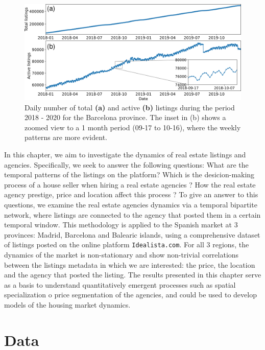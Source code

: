 \begin{figure}
    \vspace{0.2 cm}
    \centering
    \includegraphics[width =\textwidth]{Figs/Idealista_dynamics/adds_evo.pdf}
	\caption[Active listings evolution.]{\label{fig:active_adds} Daily number of total \textbf{(a)} and active \textbf{(b)} listings during the period 2018 - 2020 for the Barcelona province. The inset in (b) shows a zoomed view to a 1 month period (09-17 to 10-16), where the weekly patterns are more evident.}
\end{figure}

In this chapter, we aim to investigate the dynamics of real estate listings and agencies. Specifically, we seek to answer the following questions: What are the temporal patterns of the listings on the platform? Which is the desicion-making process of a house seller when hiring a real estate agencies ? How the real estate agency prestige, price and location affect this process ? To give an answer to this questions, we examine the real estate agencies dynamics via a temporal bipartite network, where listings are connected to the agency that posted them in a certain temporal window. This methodology is applied to the Spanish market at 3 provinces: Madrid, Barcelona and Balearic islands, using a comprehensive dataset of listings posted on the online platform \texttt{Idealista.com}. For all 3 regions, the dynamics of the market is non-stationary and show non-trivial correlations between the listings metadata in which we are interested: the price, the location and the agency that posted the listing. The results presented in this chapter serve as a basis to understand quantitatively emergent processes such as spatial specialization o price segmentation of the agencies, and could be used to develop models of the housing market dynamics.

\section{Data \label{sec:Data}}

